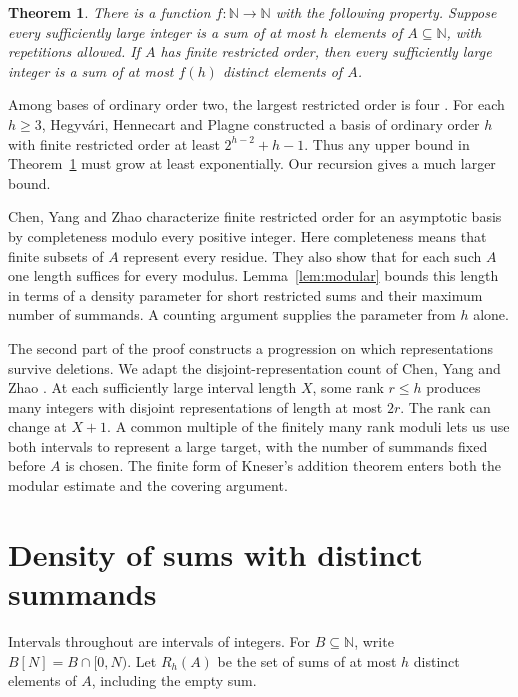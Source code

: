 \documentclass[11pt,reqno]{amsart}
\newtheorem{theorem}{Theorem}[section]
\theoremstyle{definition}
\theoremstyle{remark}
\begin{document}
\begin{theorem}\label{thm:main}
There is a function \(f:\mathbb N\to\mathbb N\) with the following property. Suppose every sufficiently large integer is a sum of at most \(h\) elements of \(A\subseteq\mathbb N\), with repetitions allowed. If \(A\) has finite restricted order, then every sufficiently large integer is a sum of at most \(f(h)\) distinct elements of \(A\).
\end{theorem}

Among bases of ordinary order two, the largest restricted order is four \cite{Hen05}. For each \(h\ge3\), Hegyv\'ari, Hennecart and Plagne \cite[Theorem~4]{HHP07} constructed a basis of ordinary order \(h\) with finite restricted order at least \(2^{h-2}+h-1\). Thus any upper bound in Theorem~\ref{thm:main} must grow at least exponentially. Our recursion gives a much larger bound.

Chen, Yang and Zhao \cite[Theorems~2 and~3]{CYZ26} characterize finite restricted order for an asymptotic basis by completeness modulo every positive integer. Here completeness means that finite subsets of \(A\) represent every residue. They also show that for each such \(A\) one length suffices for every modulus. Lemma~\ref{lem:modular} bounds this length in terms of a density parameter for short restricted sums and their maximum number of summands. A counting argument supplies the parameter from \(h\) alone.

The second part of the proof constructs a progression on which representations survive deletions. We adapt the disjoint-representation count of Chen, Yang and Zhao \cite[Lemmas~3 and~4]{CYZ26}. At each sufficiently large interval length \(X\), some rank \(r\le h\) produces many integers with disjoint representations of length at most \(2r\). The rank can change at \(X+1\). A common multiple of the finitely many rank moduli lets us use both intervals to represent a large target, with the number of summands fixed before \(A\) is chosen. The finite form of Kneser's addition theorem \cite{DeV13} enters both the modular estimate and the covering argument.

\section{Density of sums with distinct summands}\label{sec:density}

Intervals throughout are intervals of integers. For \(B\subseteq\mathbb N\), write \(B[N]=B\cap[0,N)\). Let
\(R_h(A)\) be the set of sums of at most \(h\) distinct elements of \(A\),
including the empty sum.
\end{document}
